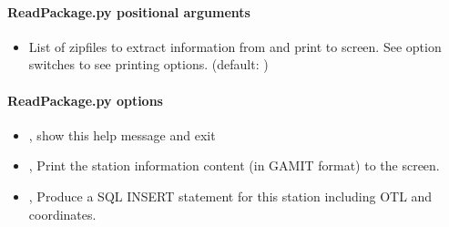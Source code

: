\documentclass[letterpaper,10pt,english]{sphinxmanual}
\begin{document}
\begin{sphinxVerbatim}[commandchars=\\\{\}]
 \PYG{p}{[}\PYG{p}{]} \PYG{p}{[}\PYG{p}{]} \PYG{p}{[}\PYG{p}{]}  \PYG{p}{[} \PYG{p}{]}
\end{sphinxVerbatim}


\paragraph{ReadPackage.py positional arguments}
\label{\detokenize{com:ReadPackage.py-positional-arguments}}\begin{itemize}
\item {} 
\sphinxAtStartPar
{\hyperref[\detokenize{com:ReadPackage.py-zipfiles}]{}} \sphinxhyphen{} List of zipfiles to extract information from and print to screen. See option switches to see printing options. (default: )

\end{itemize}


\paragraph{ReadPackage.py options}
\label{\detokenize{com:ReadPackage.py-options}}\begin{itemize}
\item {} 
\sphinxAtStartPar
{\hyperref[\detokenize{com:ReadPackage.py--h}]{}}, {\hyperref[\detokenize{com:ReadPackage.py---help}]{}} \sphinxhyphen{} show this help message and exit

\item {} 
\sphinxAtStartPar
{\hyperref[\detokenize{com:ReadPackage.py--stninfo}]{}}, {\hyperref[\detokenize{com:ReadPackage.py---station_info}]{}} \sphinxhyphen{} Print the station information content (in GAMIT format) to the screen.

\item {} 
\sphinxAtStartPar
{\hyperref[\detokenize{com:ReadPackage.py--ins}]{}}, {\hyperref[\detokenize{com:ReadPackage.py---insert_sql}]{}} \sphinxhyphen{} Produce a SQL INSERT statement for this station including OTL and coordinates.

\end{itemize}
\end{document}
